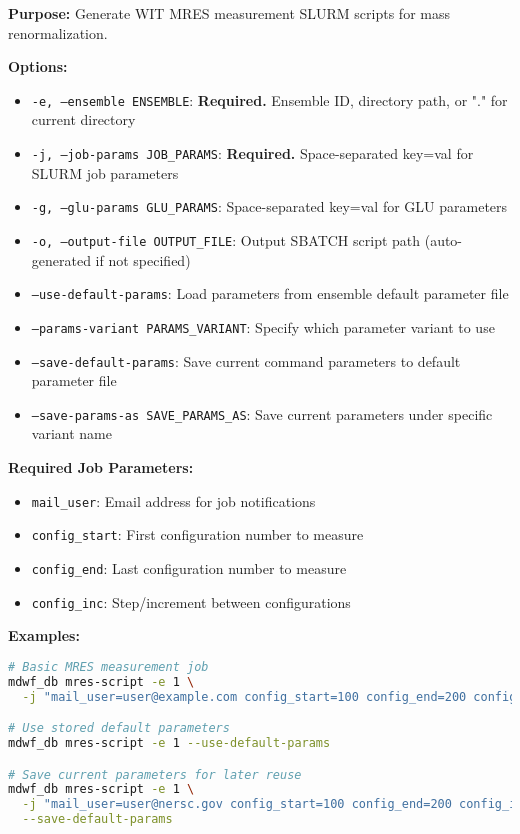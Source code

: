 \documentclass{article}
\begin{document}
\textbf{Purpose:} Generate WIT MRES measurement SLURM scripts for mass renormalization.

\textbf{Options:}
\begin{itemize}
\item \texttt{-e, --ensemble ENSEMBLE}: \textbf{Required.} Ensemble ID, directory path, or "." for current directory
\item \texttt{-j, --job-params JOB\_PARAMS}: \textbf{Required.} Space-separated key=val for SLURM job parameters
\item \texttt{-g, --glu-params GLU\_PARAMS}: Space-separated key=val for GLU parameters
\item \texttt{-o, --output-file OUTPUT\_FILE}: Output SBATCH script path (auto-generated if not specified)
\item \texttt{--use-default-params}: Load parameters from ensemble default parameter file
\item \texttt{--params-variant PARAMS\_VARIANT}: Specify which parameter variant to use
\item \texttt{--save-default-params}: Save current command parameters to default parameter file
\item \texttt{--save-params-as SAVE\_PARAMS\_AS}: Save current parameters under specific variant name
\end{itemize}

\textbf{Required Job Parameters:}
\begin{itemize}
\item \texttt{mail\_user}: Email address for job notifications
\item \texttt{config\_start}: First configuration number to measure
\item \texttt{config\_end}: Last configuration number to measure
\item \texttt{config\_inc}: Step/increment between configurations
\end{itemize}

\textbf{Examples:}
\begin{lstlisting}[language=bash]
# Basic MRES measurement job
mdwf_db mres-script -e 1 \
  -j "mail_user=user@example.com config_start=100 config_end=200 config_inc=4"

# Use stored default parameters
mdwf_db mres-script -e 1 --use-default-params

# Save current parameters for later reuse
mdwf_db mres-script -e 1 \
  -j "mail_user=user@nersc.gov config_start=100 config_end=200 config_inc=4" \
  --save-default-params
\end{lstlisting}
\end{document}
